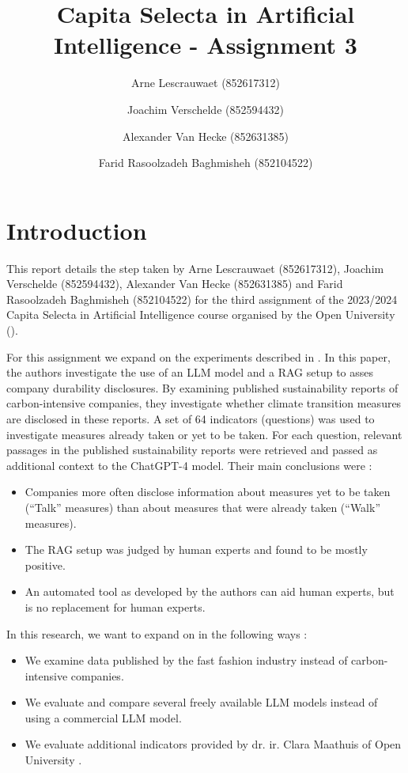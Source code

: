 \documentclass[]{article}
\title{Capita Selecta in Artificial Intelligence - Assignment 3}
\author{Arne Lescrauwaet \small(852617312) \and Joachim Verschelde \small(852594432) \and Alexander Van Hecke \small(852631385) \and Farid Rasoolzadeh Baghmisheh \small(852104522)}
\begin{document}
\maketitle

\section{Introduction} \label{sec:introduction}
This report details the step taken by Arne Lescrauwaet (852617312), Joachim Verschelde (852594432), Alexander Van Hecke (852631385) and Farid Rasoolzadeh Baghmisheh (852104522) for the third assignment of the 2023/2024 Capita Selecta in Artificial Intelligence course organised by the Open University (\cite{ou}).

For this assignment we expand on the experiments described in \cite{durability}.
In this paper, the authors investigate the use of an LLM model and a RAG setup \cite{rag} to asses company durability disclosures.
By examining published sustainability reports of carbon-intensive companies, they investigate whether climate transition measures are disclosed in these reports.
A set of 64 indicators (questions) was used to investigate measures already taken or yet to be taken.
For each question, relevant passages in the published sustainability reports were retrieved and passed as additional context to the ChatGPT-4 model.
Their main conclusions were :

\begin{itemize}
    \item Companies more often disclose information about measures yet to be taken (``Talk'' measures) than about measures that were already taken (``Walk'' measures).
    \item The RAG setup was judged by human experts and found to be mostly positive.
    \item An automated tool as developed by the authors can aid human experts, but is no replacement for human experts.
\end{itemize}

In this research, we want to expand on \cite{durability} in the following ways :

\begin{itemize}
    \item We examine data published by the fast fashion industry instead of carbon-intensive companies.
    \item We evaluate and compare several freely available LLM models instead of using a commercial LLM model.
    \item We evaluate additional indicators provided by dr. ir. Clara Maathuis of Open University \cite{ou}.
\end{itemize}
\end{document}
